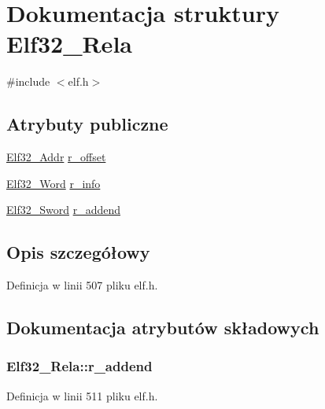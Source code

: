 \hypertarget{struct_elf32___rela}{\section{Dokumentacja struktury Elf32\-\_\-\-Rela}
\label{struct_elf32___rela}
}


{\ttfamily \#include $<$elf.\-h$>$}

\subsection*{Atrybuty publiczne}
\begin{DoxyCompactItemize}
\item 
\hyperlink{elf_8h_a40c6d4571e6001f443cc6a6474620158}{Elf32\-\_\-\-Addr} \hyperlink{struct_elf32___rela_aa850a306ee7fa3935a9f8c3d1aae4e51}{r\-\_\-offset}
\item 
\hyperlink{elf_8h_af5924ece606c732e86f8263a19408e45}{Elf32\-\_\-\-Word} \hyperlink{struct_elf32___rela_ac3a79d3f04209c33ddb4c36d07e68a79}{r\-\_\-info}
\item 
\hyperlink{elf_8h_a30ce6352cf03c667272698ada477da95}{Elf32\-\_\-\-Sword} \hyperlink{struct_elf32___rela_a1952286a900648afb9029c68a8bcea4d}{r\-\_\-addend}
\end{DoxyCompactItemize}


\subsection{Opis szczegółowy}


Definicja w linii 507 pliku elf.\-h.



\subsection{Dokumentacja atrybutów składowych}
\hypertarget{struct_elf32___rela_a1952286a900648afb9029c68a8bcea4d}{
\subsubsection[{r\-\_\-addend}]{ Elf32\-\_\-\-Rela\-::r\-\_\-addend}}\label{struct_elf32___rela_a1952286a900648afb9029c68a8bcea4d}


Definicja w linii 511 pliku elf.\-h.

